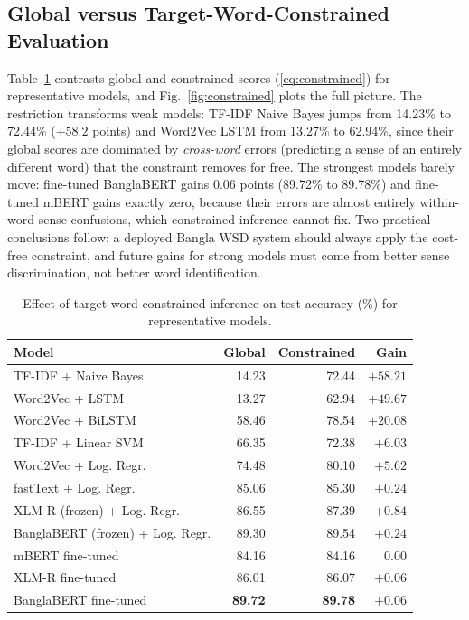 \documentclass[conference]{IEEEtran}
\begin{document}
\subsection{Global versus Target-Word-Constrained Evaluation}
Table~\ref{tab:constrained} contrasts global and constrained scores (\ref{eq:constrained}) for representative models, and Fig.~\ref{fig:constrained} plots the full picture. The restriction transforms weak models: TF-IDF Naive Bayes jumps from 14.23\% to 72.44\% ($+58.2$ points) and Word2Vec LSTM from 13.27\% to 62.94\%, since their global scores are dominated by \emph{cross-word} errors (predicting a sense of an entirely different word) that the constraint removes for free. The strongest models barely move: fine-tuned BanglaBERT gains 0.06 points (89.72\% to 89.78\%) and fine-tuned mBERT gains exactly zero, because their errors are almost entirely within-word sense confusions, which constrained inference cannot fix. Two practical conclusions follow: a deployed Bangla WSD system should always apply the cost-free constraint, and future gains for strong models must come from better sense discrimination, not better word identification.

\begin{table}[tbp]
\caption{Effect of target-word-constrained inference on test accuracy (\%) for representative models.}
\label{tab:constrained}
\centering
\scriptsize
\setlength{\tabcolsep}{4.5pt}
\begin{tabular}{@{}lrrr@{}}
\toprule
\textbf{Model} & \textbf{Global} & \textbf{Constrained} & \textbf{Gain} \\
\midrule
TF-IDF + Naive Bayes & 14.23 & 72.44 & $+58.21$ \\
Word2Vec + LSTM & 13.27 & 62.94 & $+49.67$ \\
Word2Vec + BiLSTM & 58.46 & 78.54 & $+20.08$ \\
TF-IDF + Linear SVM & 66.35 & 72.38 & $+6.03$ \\
Word2Vec + Log. Regr. & 74.48 & 80.10 & $+5.62$ \\
fastText + Log. Regr. & 85.06 & 85.30 & $+0.24$ \\
XLM-R (frozen) + Log. Regr. & 86.55 & 87.39 & $+0.84$ \\
BanglaBERT (frozen) + Log. Regr. & 89.30 & 89.54 & $+0.24$ \\
mBERT fine-tuned & 84.16 & 84.16 & $0.00$ \\
XLM-R fine-tuned & 86.01 & 86.07 & $+0.06$ \\
BanglaBERT fine-tuned & \textbf{89.72} & \textbf{89.78} & $+0.06$ \\
\bottomrule
\end{tabular}
\end{table}
\end{document}
